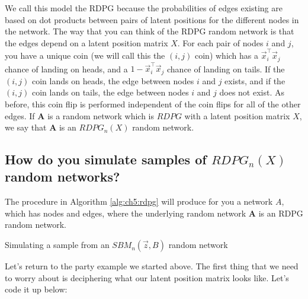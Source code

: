 We call this model the RDPG because the probabilities of edges existing are based on {dot products} between pairs of latent positions for the different nodes in the network. The way that you can think of the RDPG random network is that the edges depend on a latent position matrix $X$. For each pair of nodes $i$ and $j$, you have a unique coin (we will call this the $(i,j)$ coin) which has a $\vec x_i^\top \vec x_j$ chance of landing on heads, and a $1 - \vec x_i^\top \vec x_j$ chance of landing on tails. If the $(i,j)$ coin lands on heads, the edge between nodes $i$ and $j$ exists, and if the $(i,j)$ coin lands on tails, the edge between nodes $i$ and $j$ does not exist. As before, this coin flip is performed independent of the coin flips for all of the other edges. If $\mathbf A$ is a random network which is $RDPG$ with a latent position matrix $X$, we say that $\mathbf A$ is an $RDPG_n(X)$ random network. 

\subsection{How do you simulate samples of $RDPG_n(X)$ random networks?}


The procedure in Algorithm \ref{alg:ch5:rdpg} will produce for you a network $A$, which has nodes and edges, where the underlying random network $\mathbf A$ is an RDPG random network. 

\begin{algorithm}[h]\caption{Simulating a sample from an $SBM_n(\vec z, B)$ random network}
\label{alg:ch5:rdpg}
\SetAlgoLined
{}
 {
}

\end{algorithm}

Let's return to the party example we started above. The first thing that we need to worry about is deciphering what our latent position matrix looks like. Let's code it up below:

